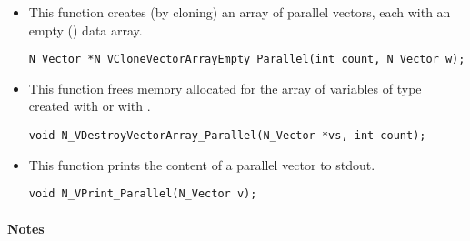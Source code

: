 \begin{itemize}

\item {}
 
  This function creates (by cloning) an array of  parallel vectors,
  each with an empty () data array.
 
\begin{verbatim}
N_Vector *N_VCloneVectorArrayEmpty_Parallel(int count, N_Vector w);
\end{verbatim}


\item {}
 
 This function frees memory allocated for the array of  variables of type 
 created with  or with .
 

 \verb|void N_VDestroyVectorArray_Parallel(N_Vector *vs, int count);|



\item {}
  
  This function prints the content of a parallel vector to stdout.
 
    
  \verb|void N_VPrint_Parallel(N_Vector v);|


\end{itemize}
\paragraph{\bf Notes} 
           
